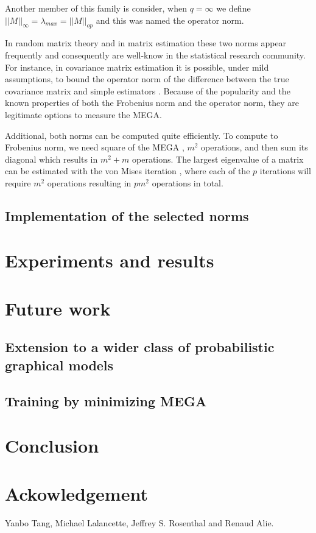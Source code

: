 \documentclass{article}
\begin{document}
\bigskip

Another member of this family is consider, when $q=\infty$ we define $||M||_\infty = \lambda_{max} = ||M||_{op}$ and this was named the operator norm.

\bigskip

In random matrix theory and in matrix estimation these two norms appear frequently and consequently are well-know in the statistical research community. For instance, in covariance matrix estimation it is possible, under mild assumptions, to bound the operator norm of the difference between the true covariance matrix and simple estimators \cite{rigollet15}. Because of the popularity and the known properties of both the Frobenius norm and the operator norm, they are legitimate options to measure the MEGA. 

\bigskip

Additional, both norms can be computed quite efficiently. To compute to Frobenius norm, we need square of the MEGA , $m^2$ operations, and then sum its diagonal which results in $m^2+m$ operations. The largest eigenvalue of a matrix can be estimated with the von Mises iteration \cite{mises29}, where each of the $p$ iterations will require $m^2$ operations resulting in $pm^2$ operations in total.


\subsection{Implementation of the selected norms}



\section{Experiments and results}

\section{Future work}
\subsection{Extension to a wider class of probabilistic graphical models}
\subsection{Training by minimizing MEGA}

\section{Conclusion}

\section*{Ackowledgement}

Yanbo Tang, Michael Lalancette, Jeffrey S. Rosenthal and Renaud Alie.

\pagebreak


\bigskip
\end{document}
